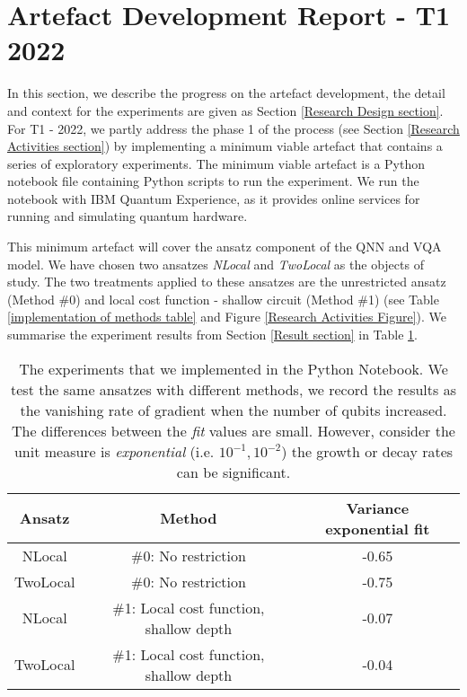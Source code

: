 \section{Artefact Development Report - T1 2022}
\label{Minimum Artefact section}
In this section, we describe the progress on the artefact development, the detail and context for the experiments are given as Section \ref{Research Design section}.
For T1 - 2022, we partly address the phase 1 of the process (see Section \ref{Research Activities section}) by implementing a minimum viable artefact that contains a series of exploratory experiments.
The minimum viable artefact is a Python notebook file containing Python scripts to run the experiment.
We run the notebook with IBM Quantum Experience, as it provides online services for running and simulating quantum hardware.

This minimum artefact will cover the ansatz component of the QNN and VQA model.
We have chosen two ansatzes \emph{NLocal} and \emph{TwoLocal} as the objects of study.
The two treatments applied to these ansatzes are the unrestricted ansatz (Method \#0) and local cost function - shallow circuit (Method \#1) (see Table \ref{implementation of methods table} and Figure \ref{Research Activities Figure}).
We summarise the experiment results from Section \ref{Result section} in Table \ref{Experiment summary table}.

\begin{table}
    \centering
    \begin{tabular}{|| c c c ||}
        \hline
        Ansatz   & Method                                  & Variance exponential fit \\[0.5ex]
        \hline \hline
        NLocal   & \#0: No restriction                     & -0.65                    \\
        \hline
        TwoLocal & \#0: No restriction                     & -0.75                    \\
        \hline
        NLocal   & \#1: Local cost function, shallow depth & -0.07                    \\
        \hline
        TwoLocal & \#1: Local cost function, shallow depth & -0.04                    \\
        \hline
    \end{tabular}
    \caption{
        The experiments that we implemented in the Python Notebook. We test the same ansatzes with different methods, we record the results as the vanishing rate of gradient when the number of qubits increased.
        The differences between the \emph{fit} values are small.
        However, consider the unit measure is \emph{exponential} (i.e. $10^{-1}, 10^{-2}$) the growth or decay rates can be significant.
    }
    \label{Experiment summary table}
\end{table}














